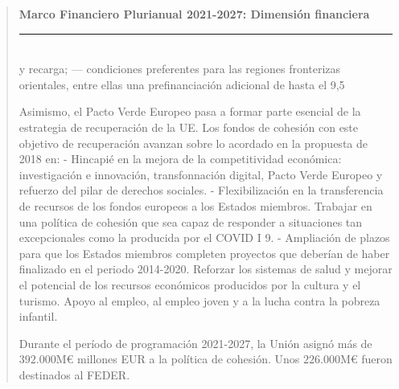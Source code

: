 \documentclass[10pt,a4paper]{article}
\newenvironment{specialblock}[1]{%
      \begin{quote} %
      \small %
      \noindent\textbf{#1}\\[-0.3em] %
      \rule{\linewidth}{0.4pt}\\[0.6em]}{
      \end{quote}}
\begin{document}
\begin{specialblock}{Marco Financiero Plurianual 2021-2027: Dimensión financiera}
y recarga; — condiciones preferentes para las regiones fronterizas orientales, entre ellas una prefinanciación adicional de hasta el 9,5 %

    Asimismo, el Pacto Verde Europeo pasa a formar parte esencial de la estrategia de recuperación de la UE. Los fondos de cohesión con este objetivo de recuperación avanzan sobre lo acordado en la propuesta de 2018 en:
    - Hincapié en la mejora de la competitividad económica: investigación e innovación, transfonnación digital, Pacto Verde Europeo y refuerzo del pilar de derechos sociales.
    - Flexibilización en la transferencia de recursos de los fondos europeos a los Estados miembros.
    Trabajar en una política de cohesión que sea capaz de responder a situaciones tan excepcionales como la producida por el COVID I 9.
    - Ampliación de plazos para que los Estados miembros completen proyectos que deberían de haber finalizado en el periodo 2014-2020. 
    Reforzar los sistemas de salud y mejorar el potencial de los recursos económicos producidos por la cultura y el turismo. Apoyo al empleo, al empleo joven y a la lucha contra la pobreza infantil.
    
    Durante el período de programación 2021-2027, la Unión asignó más de $392.000\text{M}€$ millones EUR a la política de cohesión. Unos $226.000\text{M}€$ fueron destinados al FEDER.
\end{specialblock}
\end{document}
